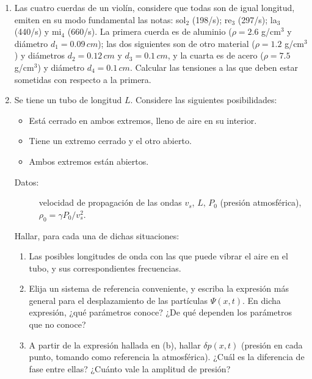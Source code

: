 \documentclass[11pt,spanish]{article}
\begin{document}
\begin{enumerate}

    \item Las cuatro cuerdas de un violín, considere que todas son de igual
    longitud, emiten en su modo fundamental las notas: sol$_{\text{2}}$ (198/s);
    re$_{\text{3}}$ (297/s); la$_{\text{3}}$ (440/s) y mi$_{\text{4}}$ (660/s).
    La primera cuerda es de aluminio ($\rho=2.6$ g/cm$^{3}$ y diámetro
    $d_{1}=0.09\unit{\, cm}$); las dos siguientes son de otro material
    ($\rho=1.2$ g/cm$^{3}$) y diámetros $d_{2}=0.12\unit{\, cm}$ y
    $d_{3}=0.1\unit{\, cm}$, y la cuarta es de acero ($\rho=7.5$ g/cm$^{3}$) y
    diámetro $d_{4}=0.1\unit{\, cm}$. Calcular las tensiones a las
    que deben estar sometidas con respecto a la primera.


    \item Se tiene un tubo de longitud $L$. Considere las siguientes
    posibilidades: 

    \begin{itemize}
        \item Está cerrado en ambos extremos, lleno de aire en su interior.
        \item Tiene un extremo cerrado y el otro abierto. 
        \item Ambos extremos están abiertos.
    \end{itemize}

    \begin{description}
        \item [{Datos:}] velocidad de propagación de las ondas $v_{s}$, $L$,
        $P_{0}$ (presión atmosférica), $\rho_{0}=\gamma P_{0}/v_{s}^{2}$.
    \end{description}

    Hallar, para cada una de dichas situaciones: 

    \begin{enumerate}
        \item Las posibles longitudes de onda con las que puede vibrar el aire
        en el tubo, y sus correspondientes frecuencias.

        \item Elija un sistema de referencia conveniente, y escriba la expresión
        más general para el desplazamiento de las partículas $\Psi(x,t)$. En
        dicha expresión, ¿qué parámetros conoce? ¿De qué dependen los parámetros
        que no conoce?

        \item A partir de la expresión hallada en (b), hallar $\delta p(x,t)$
        (presión en cada punto, tomando como referencia la atmosférica). ¿Cuál
        es la diferencia de fase entre ellas? ¿Cuánto vale la amplitud de
        presión?


\end{enumerate}
\end{enumerate}
\end{document}
